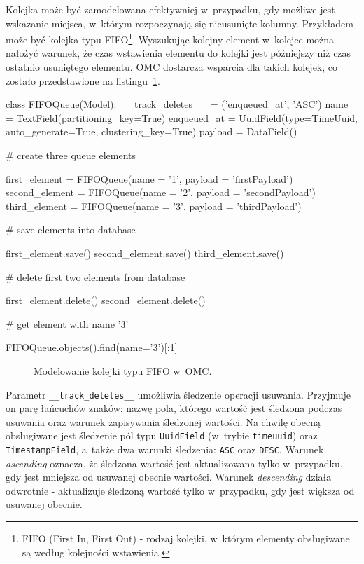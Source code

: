 Kolejka może być zamodelowana efektywniej w~przypadku, gdy możliwe jest wskazanie miejsca, w~którym rozpoczynają się nieusunięte kolumny. Przykładem może być kolejka typu FIFO\footnote{FIFO (First In, First Out) - rodzaj kolejki, w~którym elementy obsługiwane są według kolejności wstawienia.}. Wyszukując kolejny element w~kolejce można nałożyć warunek, że czas wstawienia elementu do kolejki jest późniejszy niż czas ostatnio usuniętego elementu. OMC dostarcza wsparcia dla takich kolejek, co zostało przedstawione na listingu~\ref{lst:fifo_queue_modeling}.

\begin{verbbox}[\footnotesize]
class FIFOQueue(Model):
    __track_deletes__ = ('enqueued_at', 'ASC')
    name = TextField(partitioning_key=True)
    enqueued_at = UuidField(type=TimeUuid, 
                            auto_generate=True, 
                            clustering_key=True)
    payload = DataField()

# create three queue elements

first_element = FIFOQueue(name = '1', payload = 'firstPayload')
second_element = FIFOQueue(name = '2', payload = 'secondPayload')
third_element = FIFOQueue(name = '3', payload = 'thirdPayload')

# save elements into database

first_element.save()
second_element.save()
third_element.save()

# delete first two elements from database

first_element.delete()
second_element.delete()

# get element with name '3'

FIFOQueue.objects().find(name='3')[:1]
\end{verbbox}

\begin{figure}[ht!]
	\centering
	\theverbbox
	\caption{Modelowanie kolejki typu FIFO w~OMC.}
	\label{lst:fifo_queue_modeling}
\end{figure}

Parametr \verb+__track_deletes__+ umożliwia śledzenie operacji usuwania. Przyjmuje on parę łańcuchów znaków: nazwę pola, którego wartość jest śledzona podczas usuwania oraz warunek zapisywania śledzonej wartości. Na chwilę obecną obsługiwane jest śledzenie pól typu \verb+UuidField+ (w~trybie \verb+timeuuid+) oraz \verb+TimestampField+, a~także dwa warunki śledzenia: \verb+ASC+ oraz \verb+DESC+. Warunek \emph{ascending} oznacza, że śledzona wartość jest aktualizowana tylko w~przypadku, gdy jest mniejsza od usuwanej obecnie wartości. Warunek \emph{descending} działa odwrotnie - aktualizuje śledzoną wartość tylko w~przypadku, gdy jest większa od usuwanej obecnie.

